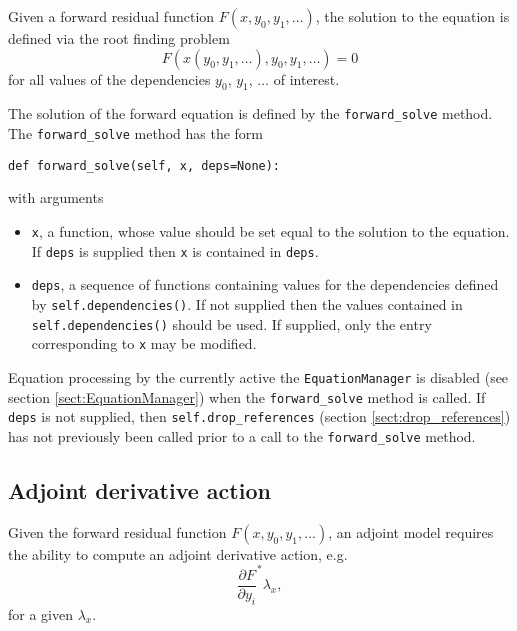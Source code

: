 \documentclass[11pt]{article}
\begin{document}
Given a forward residual function $F \left( x, y_0, y_1, \ldots \right)$, the
solution to the equation is defined via the root finding problem
\begin{equation*}
  F \left( \hat{x} \left( y_0, y_1, \ldots \right), y_0, y_1, \ldots \right)
    = 0
\end{equation*}
for all values of the dependencies $y_0$, $y_1$, $\ldots$ of interest.

The solution of the forward equation is defined by the \texttt{forward\_solve}
method. The \texttt{forward\_solve} method has the form
\begin{lstlisting}
def forward_solve(self, x, deps=None):
\end{lstlisting}
with arguments
\begin{itemize}
  \item \texttt{x}, a function, whose value should be set equal to the solution
    to the equation. If \texttt{deps} is supplied then \texttt{x} is contained
    in \texttt{deps}.
  \item \texttt{deps}, a sequence of functions containing values for the
    dependencies defined by \texttt{self.dependencies()}. If not supplied then
    the values contained in \texttt{self.dependencies()} should be used. If
    supplied, only the entry corresponding to \texttt{x} may be modified.
\end{itemize}

Equation processing by the currently active the \texttt{EquationManager} is
disabled (see section \ref{sect:EquationManager}) when the
\texttt{forward\_solve} method is called. If \texttt{deps} is not supplied,
then \texttt{self.drop\_references} (section \ref{sect:drop_references}) has
not previously been called prior to a call to the \texttt{forward\_solve}
method.

\subsection{Adjoint derivative action}\label{sect:adjoint_derivative_action}

Given the forward residual function $F \left( x, y_0, y_1, \ldots \right)$, an
adjoint model requires the ability to compute an adjoint derivative action,
e.g.
\begin{equation*}
  \frac{\partial F}{\partial y_i}^* \lambda_x,
\end{equation*}
for a given $\lambda_x$.
\end{document}
